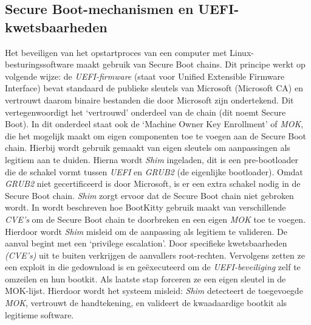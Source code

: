 \subsection{Secure Boot-mechanismen en UEFI-kwetsbaarheden}
Het beveiligen van het opstartproces van een computer met Linux-besturingssoftware maakt gebruik van Secure Boot chains. Dit principe werkt op volgende wijze: de \emph{UEFI-firmware} (staat voor Unified Extensible Firmware Interface) bevat standaard de publieke sleutels van Microsoft (Microsoft CA) en vertrouwt daarom binaire bestanden die door Microsoft zijn ondertekend. Dit vertegenwoordigt het ‘vertrouwd’ onderdeel van de chain (dit noemt Secure Boot). 
In dit onderdeel staat ook de ‘Machine Owner Key Enrollment’ of \emph{MOK}, die het mogelijk maakt om eigen componenten toe te voegen aan de Secure Boot chain. Hierbij wordt gebruik gemaakt van eigen sleutels om aanpassingen als legitiem aan te duiden. Hierna wordt \emph{Shim} ingeladen, dit is een pre-bootloader die de schakel vormt tussen \emph{UEFI} en \emph{GRUB2} (de eigenlijke bootloader). Omdat \emph{GRUB2} niet gecertificeerd is door Microsoft, is er een extra schakel nodig in de Secure Boot chain. \emph{Shim} zorgt ervoor dat de Secure Boot chain niet gebroken wordt\autocite{lee2025bootkitty}.
In \textcite{lee2025bootkitty} wordt beschreven hoe BootKitty gebruik maakt van verschillende \emph{CVE's} om de Secure Boot chain te doorbreken en een eigen \emph{MOK} toe te voegen. Hierdoor wordt \emph{Shim} misleid om de aanpassing als legitiem te valideren.
De aanval begint met een ‘privilege escalation’. Door specifieke kwetsbaarheden \emph{(CVE's)} uit te buiten verkrijgen de aanvallers root-rechten. Vervolgens zetten ze een exploit in die gedownload is en geëxecuteerd om de \emph{UEFI-beveiliging} zelf te omzeilen en hun bootkit. Als laatste stap forceren ze een eigen sleutel in de MOK-lijst. Hierdoor wordt het systeem misleid: \emph{Shim} detecteert de toegevoegde \emph{MOK}, vertrouwt de handtekening, en valideert de kwaadaardige bootkit als legitieme software.
